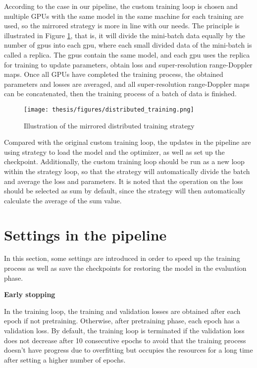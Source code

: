 According to the case in our pipeline, the custom training loop is chosen and multiple GPUs with the same model in the same machine for each training are used, so the mirrored strategy is more in line with our needs. The principle is illustrated in Figure \ref{illustration of the mirrored distributed training strategy}, that is, it will divide the mini-batch data equally by the number of \glspl{gpu} into each \gls{gpu}, where each small divided data of the mini-batch is called a replica. The \gls{gpu}s contain the same model, and each \gls{gpu} uses the replica for training to update parameters, obtain loss and super-resolution range-Doppler maps. Once all GPUs have completed the training process, the obtained parameters and losses are averaged, and all super-resolution range-Doppler maps can be concatenated, then the training process of a batch of data is finished.

\begin{figure}
	\centering
	\texttt{[image: thesis/figures/distributed\_training.png]}
	\caption{Illustration of the mirrored distributed training strategy}
	\label{illustration of the mirrored distributed training strategy}
\end{figure}

Compared with the original custom training loop, the updates in the pipeline are using strategy to load the model and the optimizer, as well as set up the checkpoint. Additionally, the custom training loop should be run as a new loop within the strategy loop, so that the strategy will automatically divide the batch and average the loss and parameters. It is noted that the operation on the loss should be selected as sum by default, since the strategy will then automatically calculate the average of the sum value.

\section{Settings in the pipeline} \label{settings in the pipeline}
In this section, some settings are introduced in order to speed up the training process as well as save the checkpoints for restoring the model in the evaluation phase.

\begin{spacing}{1.5}
\textbf{\large{Early stopping}}
\end{spacing}
In the training loop, the training and validation losses are obtained after each epoch if not pretraining. Otherwise, after pretraining phase, each epoch has a validation loss. By default, the training loop is terminated if the validation loss does not decrease after 10 consecutive epochs to avoid that the training process doesn't have progress due to overfitting but occupies the resources for a long time after setting a higher number of epochs.

